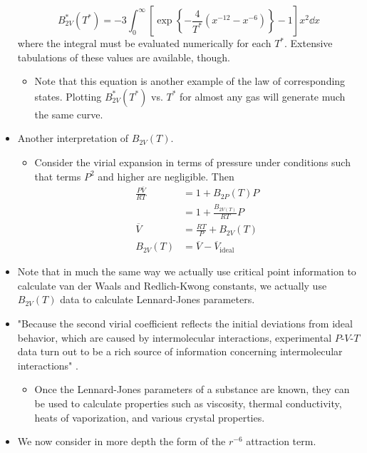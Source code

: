 \documentclass[../notes.tex]{subfiles}
\begin{document}
\begin{itemize}
    \begin{equation*}
        B_{2V}^*(T^*) = -3\int_0^\infty\left[ \exp\left\{ -\frac{4}{T^*}(x^{-12}-x^{-6}) \right\}-1 \right]x^2\dd{x}
    \end{equation*}
    where the integral must be evaluated numerically for each $T^*$. Extensive tabulations of these values are available, though.
    \begin{itemize}
        \item Note that this equation is another example of the law of corresponding states. Plotting $B_{2V}^*(T^*)$ vs. $T^*$ for almost any gas will generate much the same curve.
    \end{itemize}
    \item Another interpretation of $B_{2V}(T)$.
    \begin{itemize}
        \item Consider the virial expansion in terms of pressure under conditions such that terms $P^2$ and higher are negligible. Then
        \begin{align*}
            \frac{P\overline{V}}{RT} &= 1+B_{2P}(T)P\\
            &= 1+\frac{B_{2V(T)}}{RT}P\\
            \overline{V} &= \frac{RT}{P}+B_{2V}(T)\\
            B_{2V}(T) &= \overline{V}-\overline{V}_\text{ideal}
        \end{align*}
    \end{itemize}
    \item Note that in much the same way we actually use critical point information to calculate van der Waals and Redlich-Kwong constants, we actually use $B_{2V}(T)$ data to calculate Lennard-Jones parameters.
    \item "Because the second virial coefficient reflects the initial deviations from ideal behavior, which are caused by intermolecular interactions, experimental $P$-$V$-$T$ data turn out to be a rich source of information concerning intermolecular interactions" \parencite[665]{bib:McQuarrieSimon}.
    \begin{itemize}
        \item Once the Lennard-Jones parameters of a substance are known, they can be used to calculate properties such as viscosity, thermal conductivity, heats of vaporization, and various crystal properties.
    \end{itemize}
    \item We now consider in more depth the form of the $r^{-6}$ attraction term.

\end{itemize}
\end{document}
